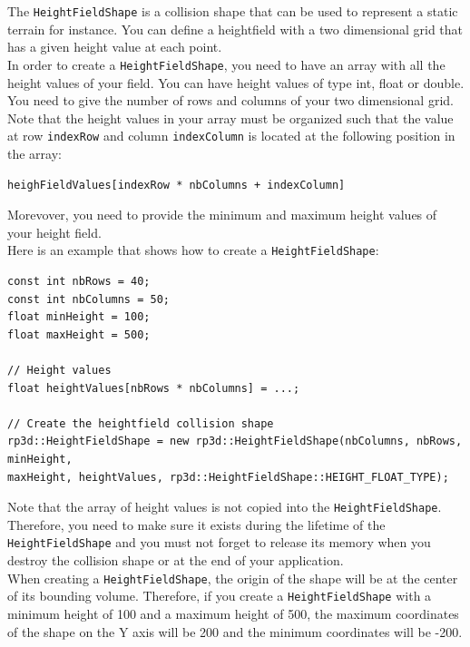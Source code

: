 \documentclass[a4paper,12pt]{article}
\begin{document}
  The \texttt{HeightFieldShape} is a collision shape that can be used to represent a static terrain for instance. You can
  define a heightfield with a two dimensional grid that has a given height value at each point. \\

  In order to create a \texttt{HeightFieldShape}, you need to have an array with all the height values of your field.
  You can have height values of type int, float or double. You need to give the number of rows and columns of your two
  dimensional grid. Note that the height values in your array must be organized such that the value at row
  \texttt{indexRow} and column \texttt{indexColumn} is located at the following position in the array:

  \begin{lstlisting}
heighFieldValues[indexRow * nbColumns + indexColumn]
  \end{lstlisting}

  \vspace{0.6cm}

  Morevover, you need to provide the minimum and maximum height values of your height field. \\

  Here is an example that shows how to create a \texttt{HeightFieldShape}: \\

  \begin{lstlisting}
const int nbRows = 40;
const int nbColumns = 50;
float minHeight = 100;
float maxHeight = 500;

// Height values
float heightValues[nbRows * nbColumns] = ...;

// Create the heightfield collision shape
rp3d::HeightFieldShape = new rp3d::HeightFieldShape(nbColumns, nbRows, minHeight,
maxHeight, heightValues, rp3d::HeightFieldShape::HEIGHT_FLOAT_TYPE);
  \end{lstlisting}

  \vspace{0.6cm}

  Note that the array of height values is not copied into the \texttt{HeightFieldShape}. Therefore, you need to make sure
  it exists during the lifetime of the \texttt{HeightFieldShape} and you must not forget to release its memory when you
  destroy the collision shape or at the end of your application. \\

  When creating a \texttt{HeightFieldShape}, the origin of the shape will be at the center of its bounding volume.
  Therefore, if you create a \texttt{HeightFieldShape} with a minimum height of 100 and a maximum height of 500, the
  maximum coordinates of the shape on the Y axis will be 200 and the minimum coordinates will be -200.
\end{document}
